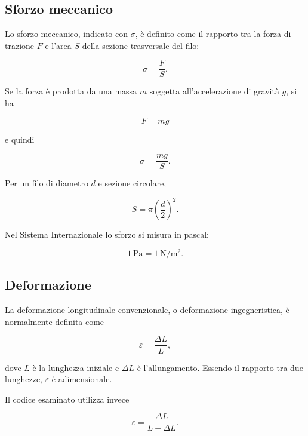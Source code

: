 \documentclass[11pt,a4paper]{book}
\begin{document}
\subsection{Sforzo meccanico}

Lo sforzo meccanico, indicato con $\sigma$, è definito come il rapporto tra la forza di trazione $F$ e l'area $S$ della sezione trasversale del filo:

\begin{equation}
    \sigma = \frac{F}{S}.
\end{equation}

Se la forza è prodotta da una massa $m$ soggetta all'accelerazione di gravità $g$, si ha

\begin{equation}
    F=mg
\end{equation}

e quindi

\begin{equation}
    \sigma = \frac{mg}{S}.
\end{equation}

Per un filo di diametro $d$ e sezione circolare,

\begin{equation}
    S=\pi\left(\frac{d}{2}\right)^2.
\end{equation}

Nel Sistema Internazionale lo sforzo si misura in pascal:

\begin{equation}
    1\ \si{\pascal}=1\ \si{\newton\per\square\metre}.
\end{equation}

\subsection{Deformazione}

La deformazione longitudinale convenzionale, o deformazione ingegneristica, è normalmente definita come

\begin{equation}
    \varepsilon=\frac{\Delta L}{L},
\end{equation}

dove $L$ è la lunghezza iniziale e $\Delta L$ è l'allungamento. Essendo il rapporto tra due lunghezze, $\varepsilon$ è adimensionale.

Il codice esaminato utilizza invece

\begin{equation}
    \varepsilon=\frac{\Delta L}{L+\Delta L}.
\end{equation}
\end{document}
